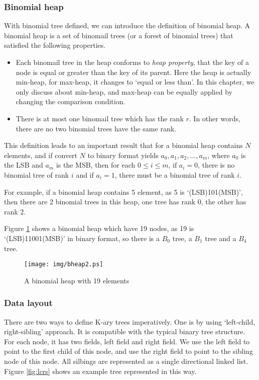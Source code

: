\documentclass{article}
\begin{document}
\subsubsection{Binomial heap}
\label{Binomial heap} 

With binomial tree defined, we can introduce the definition of binomial heap. A binomial heap is a set of binomail trees (or a forest of binomial trees) that satisfied the following properties.

\begin{itemize}
\item Each binomail tree in the heap conforms to {\em heap property}, that the key of a node is equal or greater than the key of its parent. Here the heap is actually min-heap, for max-heap, it changes to `equal or less than'. In this chapter, we only discuss about min-heap, and max-heap can be equally applied by changing the comparison condition.
\item There is at most one binomail tree which has the rank $r$. In other words, there are no two binomial trees have the same rank.
\end{itemize}

This definition leads to an important result that for a binomial heap contains $N$ elements, and if convert $N$ to binary format yields $a_0, a_1, a_2, ..., a_m$, where $a_0$ is the LSB and $a_m$ is the MSB, then for each $0 \leq i \leq m$, if $a_i=0$, there is no binomial tree of rank $i$ and if $a_i = 1$, there must be a binomial tree of rank $i$.

For example, if a binomial heap contains 5 element, as 5 is `(LSB)101(MSB)', then there are 2 binomial trees in this heap, one tree has rank 0, the other has rank 2.

Figure \ref{fig:bheap2} shows a binomial heap which have 19 nodes, as 19 is `(LSB)11001(MSB)' in binary format, so there is a $B_0$ tree, a $B_1$ tree and a $B_4$ tree.

\begin{figure}[htbp]
  \centering
  \texttt{[image: img/bheap2.ps]}
  \caption{A binomial heap with 19 elements} \label{fig:bheap2}
\end{figure}

\subsubsection{Data layout}
There are two ways to define K-ary trees imperatively. One is by using
`left-child, right-sibling' approach\cite{CLRS}. It is compatible with 
the typical binary tree structure. For each node, it has two fields,
left field and right field. We use the left field to point to the first
child of this node, and use the right field to point to the sibling
node of this node. All silbings are represented as a single directional
linked list. Figure \ref{fig:lcrs} shows an example tree represented in this way.
\end{document}
